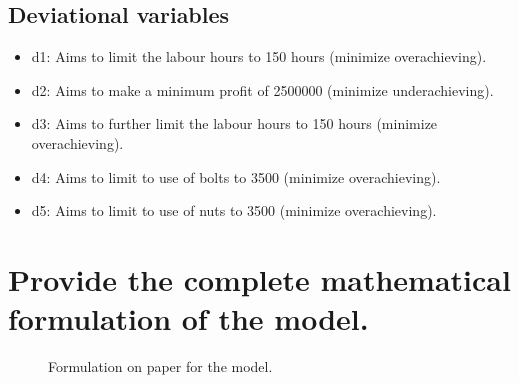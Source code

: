 \documentclass[a4paper,oneside,11pt]{book}
\begin{document}
\subsection{Deviational variables}
\begin{itemize}
    \item d1: Aims to limit the labour hours to 150 hours (minimize overachieving).
    \item d2: Aims to make a minimum profit of 2500000 (minimize underachieving).
    \item d3: Aims to further limit the labour hours to 150 hours (minimize overachieving).
    \item d4: Aims to limit to use of bolts to 3500 (minimize overachieving).
    \item d5: Aims to limit to use of nuts to 3500 (minimize overachieving).

\end{itemize}
\newpage
\section{Provide the complete mathematical formulation of the model.}
\begin{figure}[H]
    \centering
    \caption{Formulation on paper for the model.}
\end{figure}
\clearpage
\end{document}
